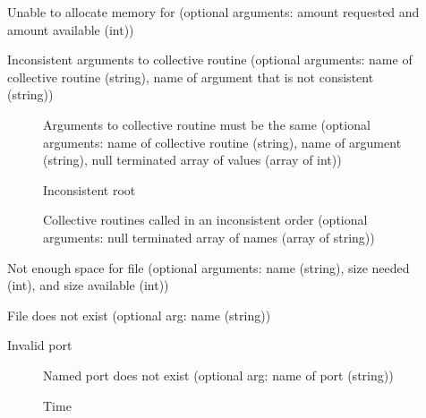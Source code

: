 \begin{description}
\item[ ]Unable to allocate
  memory for 
   (optional arguments: amount requested and amount
  available (int))
\item[ ]Inconsistent
  arguments to collective routine 
(optional arguments: name of collective routine (string), name of argument
that is not consistent (string))
    \begin{description}
    \item[
]Arguments to collective routine 
      must be the same (optional arguments: name of collective routine
      (string), name of argument (string), null terminated array of values
      (array of int))
    \item[
      ]Inconsistent root 
    \item[
      ]Collective routines 
      called in an inconsistent order (optional arguments: null terminated
      array of names (array of string))
    \end{description}
\item[ ]Not enough space
      for file (optional 
  arguments: name (string), size needed (int), and size available (int))
\item[ ]File does not
  exist (optional arg: name (string)) 
\item[ ]Invalid port
    \begin{description}
    \item[ ]Named port
    does not exist (optional 
      arg: name of port (string))
    \item[ ]Time

\end{description}
\end{description}
